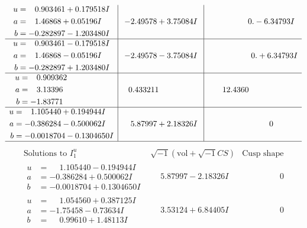\documentclass[1p]{elsarticle_modified}
\theoremstyle{definition}
\newcommand{\I}{\sqrt{-1}}
\begin{document}
$$\begin{array}{c|c|c}
\begin{aligned}
u &= \phantom{-}0.903461 + 0.179518 I \\
a &= \phantom{-}1.46868 + 0.05196 I \\
b &= -0.282897 - 1.203480 I\end{aligned}
 & -2.49578 + 3.75084 I & \phantom{-0.000000 } 0. - 6.34793 I \\ \hline\begin{aligned}
u &= \phantom{-}0.903461 - 0.179518 I \\
a &= \phantom{-}1.46868 - 0.05196 I \\
b &= -0.282897 + 1.203480 I\end{aligned}
 & -2.49578 - 3.75084 I & \phantom{-0.000000 -}0. + 6.34793 I \\ \hline\begin{aligned}
u &= \phantom{-}0.909362\phantom{ +0.000000I} \\
a &= \phantom{-}3.13396\phantom{ +0.000000I} \\
b &= -1.83771\phantom{ +0.000000I}\end{aligned}
 & \phantom{-}0.433211\phantom{ +0.000000I} & \phantom{-}12.4360\phantom{ +0.000000I} \\ \hline\begin{aligned}
u &= \phantom{-}1.105440 + 0.194944 I \\
a &= -0.386284 - 0.500062 I \\
b &= -0.0018704 - 0.1304650 I\end{aligned}
 & \phantom{-}5.87997 + 2.18326 I & \phantom{-0.000000 } 0\\
 \hline 
 \end{array}$$\newpage$$\begin{array}{c|c|c}  
\text{Solutions to }I^u_{1}& \I (\text{vol} + \sqrt{-1}CS) & \text{Cusp shape}\\
 \hline 
\begin{aligned}
u &= \phantom{-}1.105440 - 0.194944 I \\
a &= -0.386284 + 0.500062 I \\
b &= -0.0018704 + 0.1304650 I\end{aligned}
 & \phantom{-}5.87997 - 2.18326 I & \phantom{-0.000000 } 0 \\ \hline\begin{aligned}
u &= \phantom{-}1.054560 + 0.387125 I \\
a &= -1.75458 - 0.73634 I \\
b &= \phantom{-}0.99610 + 1.48113 I\end{aligned}
 & \phantom{-}3.53124 + 6.84405 I & \phantom{-0.000000 } 0 \\ \hline\begin{aligned}

\end{aligned}
\end{array}$$
\end{document}
